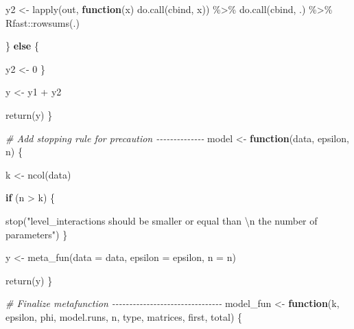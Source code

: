\documentclass[
  11pt,
]{article}
\newenvironment{Shaded}{\begin{snugshade}}{\end{snugshade}}
\newcommand{\AttributeTok}[1]{\textcolor[rgb]{0.77,0.63,0.00}{#1}}
\newcommand{\CommentTok}[1]{\textcolor[rgb]{0.56,0.35,0.01}{\textit{#1}}}
\newcommand{\ControlFlowTok}[1]{\textcolor[rgb]{0.13,0.29,0.53}{\textbf{#1}}}
\newcommand{\DecValTok}[1]{\textcolor[rgb]{0.00,0.00,0.81}{#1}}
\newcommand{\FunctionTok}[1]{\textcolor[rgb]{0.00,0.00,0.00}{#1}}
\newcommand{\NormalTok}[1]{#1}
\newcommand{\OtherTok}[1]{\textcolor[rgb]{0.56,0.35,0.01}{#1}}
\newcommand{\SpecialCharTok}[1]{\textcolor[rgb]{0.00,0.00,0.00}{#1}}
\newcommand{\StringTok}[1]{\textcolor[rgb]{0.31,0.60,0.02}{#1}}
\begin{document}
\begin{Shaded}
\begin{Highlighting}[]
\NormalTok{    y2 }\OtherTok{\textless{}{-}} \FunctionTok{lapply}\NormalTok{(out, }\ControlFlowTok{function}\NormalTok{(x) }\FunctionTok{do.call}\NormalTok{(cbind, x)) }\SpecialCharTok{\%\textgreater{}\%}
      \FunctionTok{do.call}\NormalTok{(cbind, .) }\SpecialCharTok{\%\textgreater{}\%}
\NormalTok{      Rfast}\SpecialCharTok{::}\FunctionTok{rowsums}\NormalTok{(.)}

\NormalTok{  \} }\ControlFlowTok{else}\NormalTok{ \{}

\NormalTok{    y2 }\OtherTok{\textless{}{-}} \DecValTok{0}
\NormalTok{  \}}

\NormalTok{  y }\OtherTok{\textless{}{-}}\NormalTok{ y1 }\SpecialCharTok{+}\NormalTok{ y2}

  \FunctionTok{return}\NormalTok{(y)}
\NormalTok{\}}

\CommentTok{\# Add stopping rule for precaution {-}{-}{-}{-}{-}{-}{-}{-}{-}{-}{-}{-}{-}{-}}
\NormalTok{model }\OtherTok{\textless{}{-}} \ControlFlowTok{function}\NormalTok{(data, epsilon, n) \{}

\NormalTok{  k }\OtherTok{\textless{}{-}} \FunctionTok{ncol}\NormalTok{(data)}

  \ControlFlowTok{if}\NormalTok{ (n }\SpecialCharTok{\textgreater{}}\NormalTok{ k) \{}

    \FunctionTok{stop}\NormalTok{(}\StringTok{"level\_interactions should be smaller or equal than }\SpecialCharTok{\textbackslash{}n}
\StringTok{         the number of parameters"}\NormalTok{)}
\NormalTok{  \}}

\NormalTok{  y }\OtherTok{\textless{}{-}} \FunctionTok{meta\_fun}\NormalTok{(}\AttributeTok{data =}\NormalTok{ data, }\AttributeTok{epsilon =}\NormalTok{ epsilon, }\AttributeTok{n =}\NormalTok{ n)}

  \FunctionTok{return}\NormalTok{(y)}
\NormalTok{\}}

\CommentTok{\# Finalize metafunction {-}{-}{-}{-}{-}{-}{-}{-}{-}{-}{-}{-}{-}{-}{-}{-}{-}{-}{-}{-}{-}{-}{-}{-}{-}{-}{-}{-}{-}{-}{-}{-}}
\NormalTok{model\_fun }\OtherTok{\textless{}{-}} \ControlFlowTok{function}\NormalTok{(k, epsilon, phi, model.runs, n, type, matrices, }
\NormalTok{                      first, total) \{}


\end{Highlighting}
\end{Shaded}
\end{document}
